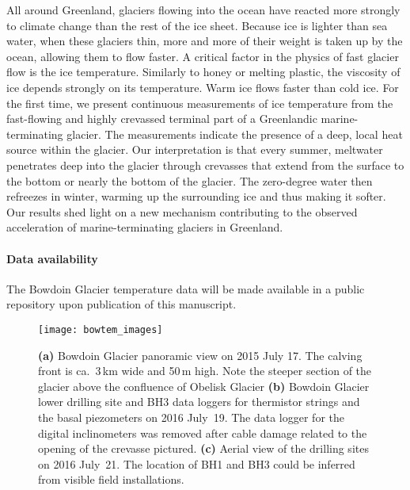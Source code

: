 \documentclass[utf8]{article}
\begin{document}
    All around Greenland, glaciers flowing into the ocean have reacted more
    strongly
    to climate change than the rest of the ice sheet. Because ice is lighter
    than sea water, when these glaciers thin, more and more of their weight is
    taken up by the ocean, allowing them to flow faster. A critical factor in
    the physics of fast glacier flow is the ice temperature. Similarly to honey
    or melting plastic, the viscosity of ice depends strongly on its
    temperature. Warm ice flows faster than cold ice.
    For the first time, we present continuous measurements of ice
    temperature from the fast-flowing and highly crevassed terminal part of a
    Greenlandic marine-terminating glacier. The measurements indicate the
    presence of a deep, local heat source within the glacier. Our
    interpretation is that every summer, meltwater penetrates deep into the
    glacier through crevasses that extend from the surface to the bottom or
    nearly the bottom of the glacier. The zero-degree water then refreezes in
    winter, warming up the surrounding ice and thus making it softer.
    Our results shed light on a new mechanism contributing to the observed
    acceleration of marine-terminating glaciers in Greenland.

\paragraph{Data availability}

    The Bowdoin Glacier temperature data will be made available in a public
    repository upon publication of this manuscript.







\clearpage

    \begin{figure}
      \centerline{\texttt{[image: bowtem\_images]}}
      \caption{%
        \textbf{(a)} Bowdoin Glacier panoramic view on 2015 July 17. The
          calving front is ca.~3\,km wide and 50\,m high. Note the steeper
          section of the glacier above the confluence of Obelisk Glacier
        \textbf{(b)} Bowdoin Glacier lower drilling site and BH3 data loggers
          for thermistor strings and the basal piezometers on 2016 July~19. The
          data logger for the digital inclinometers was removed after cable
          damage related to the opening of the crevasse pictured.
        \textbf{(c)} Aerial view of the drilling sites on 2016 July~21. The
          location of BH1 and BH3 could be inferred from visible field
          installations.}
      \label{fig:images}
    \end{figure}
\end{document}
